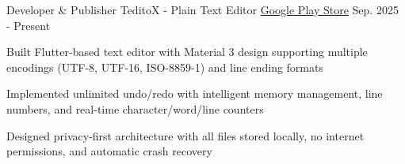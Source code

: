\begin{cventries}
  \cventry
    {Developer \& Publisher} %
    {TeditoX - Plain Text Editor} %
    {\href{https://play.google.com/store/apps/details?id=org.zp1ke.teditox}{Google Play Store}} %
    {Sep. 2025 - Present} %
    {
      \begin{cvitems} %
        \item {Built Flutter-based text editor with Material 3 design supporting multiple encodings (UTF-8, UTF-16, ISO-8859-1) and line ending formats}
        \item {Implemented unlimited undo/redo with intelligent memory management, line numbers, and real-time character/word/line counters}
        \item {Designed privacy-first architecture with all files stored locally, no internet permissions, and automatic crash recovery}
      \end{cvitems}
    }


\end{cventries}
